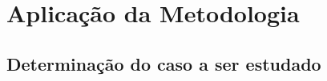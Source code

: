 



\chapter{Aplicação da Metodologia}
\label{cap_resultado}


\section{Determinação do caso a ser estudado}









